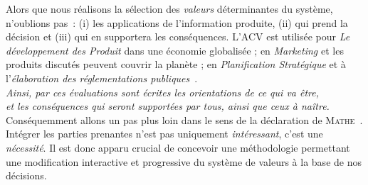 Alors que nous réalisons la sélection des \emph{valeurs} déterminantes du système, n'oublions pas~:
(i) les applications de l'information produite,
(ii) qui prend la décision
et (iii) qui en supportera les conséquences.
L'ACV est utilisée pour \emph{Le développement des Produit} dans une économie globalisée ; en \emph{Marketing} et les produits discutés peuvent couvrir la planète ; en \emph{Planification Stratégique} et à l'\emph{élaboration des réglementations publiques}~\cite{european_commission_ilcd_2010}.\\
\textit{Ainsi, par ces évaluations sont écrites les orientations de ce qui va être,\\
et les conséquences qui seront supportées par tous, ainsi que ceux à naître.\\}
Conséquemment allons un pas plus loin dans le sens de la déclaration de \textsc{Mathe}~\cite{mathe_integrating_2014}.
Intégrer les parties prenantes n'est pas uniquement \emph{intéressant}, c'est une \emph{nécessité}.
Il est donc apparu crucial de concevoir une méthodologie permettant une modification interactive et progressive du système de valeurs à la base de nos décisions. 



